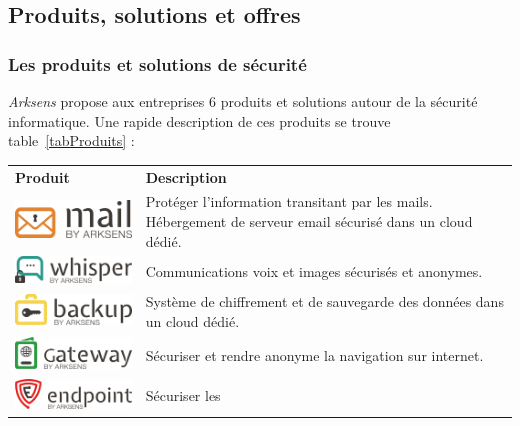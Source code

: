 \documentclass[a4paper,10pt, twoside]{report}
\begin{document}
\begin{spacing}{1.2}
\subsection{Produits, solutions et offres}
\subsubsection{Les produits et solutions de s\'ecurit\'e}
\textit{Arksens} propose aux entreprises 6 produits et solutions autour de la
s\'ecurit\'e informatique. Une rapide description de ces produits se trouve
table~\ref{tabProduits} :
\begin{table}[h!]
  \centering
  \def\arraystretch{1.5}
  \setlength{\fboxsep}{13pt} %
  \setlength{\fboxrule}{0pt} %
  \begin{tabular}{m{6cm}m{6cm}}
   \rowcolor{arkred} 
    \arrayrulecolor{gray73}\hline
    \color{white} \textbf{Produit} & \color{white} \textbf{Description} \\
    \includegraphics[width=5cm, fbox]{produits/mail.png} & Prot\'eger l'information
    transitant par les mails. H\'ebergement de serveur email s\'ecuris\'e dans
    un cloud d\'edi\'e.\\
    \hline
    \includegraphics[width=5cm, fbox]{produits/whisper.png} & Communications voix
    et images s\'ecuris\'es et anonymes.\\
    \hline
    \includegraphics[width=5cm, fbox]{produits/backup.png} & Syst\`eme de
    chiffrement et de sauvegarde des donn\'ees dans un cloud d\'edi\'e.\\
    \hline
    \includegraphics[width=5cm, fbox]{produits/gateway.png} & S\'ecuriser et
    rendre anonyme la navigation sur internet.\\
    \hline
    \includegraphics[width=5cm, fbox]{produits/endpoint.png} & S\'ecuriser les

\end{tabular}
\end{table}
\end{spacing}
\end{document}
